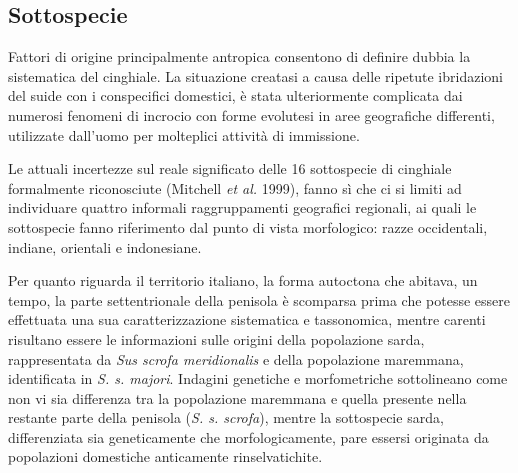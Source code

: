 \begin{multicols}{2}
\section{Sottospecie}Fattori di origine principalmente antropica
consentono di definire dubbia la sistematica del cinghiale. La
situazione creatasi a causa delle ripetute ibridazioni del suide con i
conspecifici domestici, \`e stata ulteriormente complicata dai numerosi
fenomeni di incrocio con forme evolutesi in aree geografiche
differenti, utilizzate dall{\textquoteright}uomo per molteplici
attivit\`a di immissione.

Le attuali incertezze sul reale significato delle 16 sottospecie di
cinghiale formalmente riconosciute (Mitchell \textit{et al.} 1999),
fanno s\`i che ci si limiti ad individuare quattro informali
raggruppamenti geografici regionali, ai quali le sottospecie fanno
riferimento dal punto di vista morfologico: razze occidentali, indiane,
orientali e indonesiane. 

Per quanto riguarda il territorio italiano, la forma autoctona che
abitava, un tempo, la parte settentrionale della penisola \`e scomparsa
prima che potesse essere effettuata una sua caratterizzazione
sistematica e tassonomica, mentre carenti risultano essere le
informazioni sulle origini della popolazione sarda, rappresentata da
\textit{Sus scrofa meridionalis} e della popolazione maremmana,
identificata in \textit{S. s. majori}. Indagini genetiche e
morfometriche sottolineano come non vi sia differenza tra la
popolazione maremmana e quella presente nella restante parte della
penisola (\textit{S. s. scrofa}), mentre la sottospecie sarda,
differenziata sia geneticamente che morfologicamente, pare essersi
originata da popolazioni domestiche anticamente rinselvatichite.



\end{multicols}
